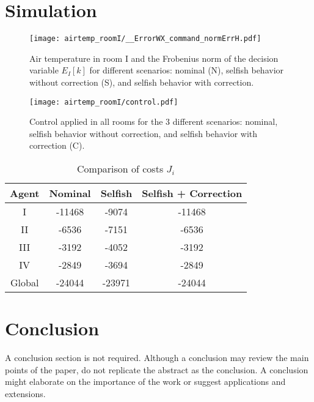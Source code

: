 \documentclass{ifacconf}  %
\begin{document}
\section{Simulation}
\begin{figure}[h]
  \centering
 \texttt{[image: airtemp\_roomI/\_\_ErrorWX\_command\_normErrH.pdf]}
  \caption{Air temperature in room I and the Frobenius norm of the decision variable $E_{I}[k]$ for different scenarios: nominal (N), selfish behavior without correction (S),
and selfish behavior with correction.}\label{fig:response3Scenarios}
\end{figure}
\begin{figure}[h]
  \centering
 \texttt{[image: airtemp\_roomI/control.pdf]}
  \caption{Control applied in all rooms for the 3 different scenarios: nominal, selfish behavior without correction, and selfish behavior with correction (C).}\label{fig:response3Scenarios}
\end{figure}

\begin{table}[t]
  \centering
  \caption{Comparison of costs $J_{i}$}\label{tab:costsGlobalLocal}
  \begin{tabular}[t]{cccc} \toprule
    Agent  & Nominal & Selfish & Selfish + Correction\\
    \midrule
    I & -11468 &  -9074 & -11468 \\
    II & -6536 &  -7151 & -6536 \\
    III & -3192 &  -4052 & -3192 \\
    IV & -2849 &  -3694 & -2849 \\
    Global & -24044 &  -23971 & -24044 \\


    \bottomrule
  \end{tabular}
\end{table}

\section{Conclusion}

A conclusion section is not required. Although a conclusion may review
the main points of the paper, do not replicate the abstract as the
conclusion. A conclusion might elaborate on the importance of the work
or suggest applications and extensions.


\end{document}
